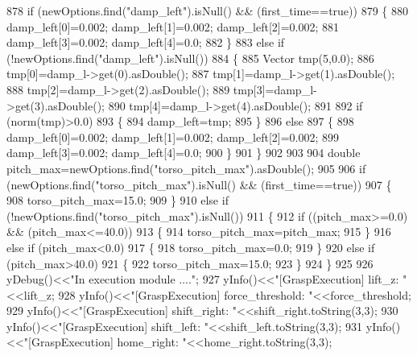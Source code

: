 \begin{DoxyCode}
878     \textcolor{keywordflow}{if} (newOptions.find(\textcolor{stringliteral}{"damp\_left"}).isNull() && (first\_time==\textcolor{keyword}{true}))
879     \{
880         damp\_left[0]=0.002; damp\_left[1]=0.002; damp\_left[2]=0.002;
881         damp\_left[3]=0.002; damp\_left[4]=0.0;
882     \}
883     \textcolor{keywordflow}{else} \textcolor{keywordflow}{if} (!newOptions.find(\textcolor{stringliteral}{"damp\_left"}).isNull())
884     \{
885         Vector tmp(5,0.0);
886         tmp[0]=damp\_l->get(0).asDouble();
887         tmp[1]=damp\_l->get(1).asDouble();
888         tmp[2]=damp\_l->get(2).asDouble();
889         tmp[3]=damp\_l->get(3).asDouble();
890         tmp[4]=damp\_l->get(4).asDouble();
891 
892         \textcolor{keywordflow}{if} (norm(tmp)>0.0)
893         \{
894             damp\_left=tmp;
895         \}
896         \textcolor{keywordflow}{else}
897         \{
898             damp\_left[0]=0.002; damp\_left[1]=0.002; damp\_left[2]=0.002;
899             damp\_left[3]=0.002; damp\_left[4]=0.0; 
900         \}
901     \}
902 
903 
904     \textcolor{keywordtype}{double} pitch\_max=newOptions.find(\textcolor{stringliteral}{"torso\_pitch\_max"}).asDouble();
905 
906     \textcolor{keywordflow}{if} (newOptions.find(\textcolor{stringliteral}{"torso\_pitch\_max"}).isNull() && (first\_time==\textcolor{keyword}{true}))
907     \{
908         torso\_pitch\_max=15.0;
909     \}
910     \textcolor{keywordflow}{else} \textcolor{keywordflow}{if} (!newOptions.find(\textcolor{stringliteral}{"torso\_pitch\_max"}).isNull())
911     \{
912         \textcolor{keywordflow}{if} ((pitch\_max>=0.0) && (pitch\_max<=40.0))
913         \{
914             torso\_pitch\_max=pitch\_max;
915         \}
916         \textcolor{keywordflow}{else} \textcolor{keywordflow}{if} (pitch\_max<0.0)
917         \{
918             torso\_pitch\_max=0.0;
919         \}
920         \textcolor{keywordflow}{else} \textcolor{keywordflow}{if} (pitch\_max>40.0)
921         \{
922             torso\_pitch\_max=15.0;
923         \}
924     \}
925 
926     yDebug()<<\textcolor{stringliteral}{"In execution module ...."};
927     yInfo()<<\textcolor{stringliteral}{"[GraspExecution] lift\_z:          "}<<lift\_z;
928     yInfo()<<\textcolor{stringliteral}{"[GraspExecution] force\_threshold: "}<<force\_threshold;
929     yInfo()<<\textcolor{stringliteral}{"[GraspExecution] shift\_right:     "}<<shift\_right.toString(3,3);
930     yInfo()<<\textcolor{stringliteral}{"[GraspExecution] shift\_left:      "}<<shift\_left.toString(3,3);
931     yInfo()<<\textcolor{stringliteral}{"[GraspExecution] home\_right:      "}<<home\_right.toString(3,3);

\end{DoxyCode}
